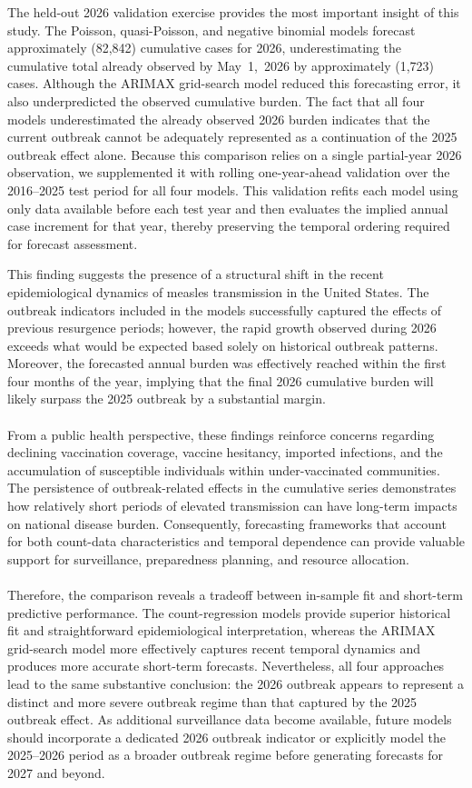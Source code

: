 \documentclass[utf8]{FrontiersinHarvard} %
\begin{document}
The held-out 2026 validation exercise provides the most important insight of this study. The Poisson, quasi-Poisson, and negative binomial models forecast approximately (82,842) cumulative cases for 2026, underestimating the cumulative total already observed by May~1,~2026 by approximately (1,723) cases. Although the ARIMAX grid-search model reduced this forecasting error, it also underpredicted the observed cumulative burden. The fact that all four models underestimated the already observed 2026 burden indicates that the current outbreak cannot be adequately represented as a continuation of the 2025 outbreak effect alone. Because this comparison relies on a single partial-year 2026 observation, we supplemented it with rolling one-year-ahead validation over the 2016--2025 test period for all four models. This validation refits each model using only data available before each test year and then evaluates the implied annual case increment for that year, thereby preserving the temporal ordering required for forecast assessment.

This finding suggests the presence of a structural shift in the recent epidemiological dynamics of measles transmission in the United States. The outbreak indicators included in the models successfully captured the effects of previous resurgence periods; however, the rapid growth observed during 2026 exceeds what would be expected based solely on historical outbreak patterns. Moreover, the forecasted annual burden was effectively reached within the first four months of the year, implying that the final 2026 cumulative burden will likely surpass the 2025 outbreak by a substantial margin.
\\~~\\
From a public health perspective, these findings reinforce concerns regarding declining vaccination coverage, vaccine hesitancy, imported infections, and the accumulation of susceptible individuals within under-vaccinated communities. The persistence of outbreak-related effects in the cumulative series demonstrates how relatively short periods of elevated transmission can have long-term impacts on national disease burden. Consequently, forecasting frameworks that account for both count-data characteristics and temporal dependence can provide valuable support for surveillance, preparedness planning, and resource allocation.
\\~~\\
Therefore, the comparison reveals a tradeoff between in-sample fit and short-term predictive performance. The count-regression models provide superior historical fit and straightforward epidemiological interpretation, whereas the ARIMAX grid-search model more effectively captures recent temporal dynamics and produces more accurate short-term forecasts. Nevertheless, all four approaches lead to the same substantive conclusion: the 2026 outbreak appears to represent a distinct and more severe outbreak regime than that captured by the 2025 outbreak effect. As additional surveillance data become available, future models should incorporate a dedicated 2026 outbreak indicator or explicitly model the 2025--2026 period as a broader outbreak regime before generating forecasts for 2027 and beyond.
\end{document}
